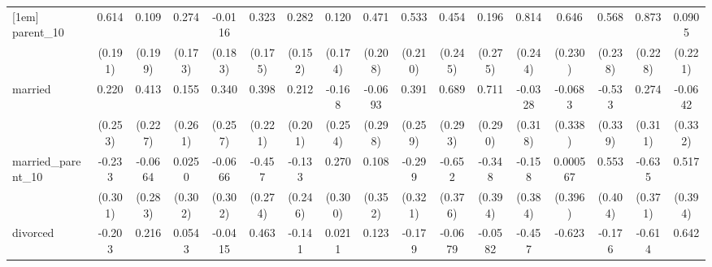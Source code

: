 {\begin{tabular}{l*{16}{c}}
[1em]
parent\_10           &       0.614\sym{**} &       0.109         &       0.274         &     -0.0116         &       0.323         &       0.282         &       0.120         &       0.471\sym{*}  &       0.533\sym{*}  &       0.454         &       0.196         &       0.814\sym{***}&       0.646\sym{**} &       0.568\sym{*}  &       0.873\sym{***}&      0.0905         \\
                    &     (0.191)         &     (0.199)         &     (0.173)         &     (0.183)         &     (0.175)         &     (0.152)         &     (0.174)         &     (0.208)         &     (0.210)         &     (0.245)         &     (0.275)         &     (0.244)         &     (0.230)         &     (0.238)         &     (0.228)         &     (0.221)         \\
[1em]
married             &       0.220         &       0.413         &       0.155         &       0.340         &       0.398         &       0.212         &      -0.168         &     -0.0693         &       0.391         &       0.689\sym{*}  &       0.711\sym{*}  &     -0.0328         &     -0.0683         &      -0.533         &       0.274         &     -0.0642         \\
                    &     (0.253)         &     (0.227)         &     (0.261)         &     (0.257)         &     (0.221)         &     (0.201)         &     (0.254)         &     (0.298)         &     (0.259)         &     (0.293)         &     (0.290)         &     (0.318)         &     (0.338)         &     (0.339)         &     (0.311)         &     (0.332)         \\
[1em]
married\_parent\_10   &      -0.233         &     -0.0664         &      0.0250         &     -0.0666         &      -0.457         &      -0.133         &       0.270         &       0.108         &      -0.299         &      -0.652         &      -0.348         &      -0.158         &    0.000567         &       0.553         &      -0.635         &       0.517         \\
                    &     (0.301)         &     (0.283)         &     (0.302)         &     (0.302)         &     (0.274)         &     (0.246)         &     (0.300)         &     (0.352)         &     (0.321)         &     (0.376)         &     (0.394)         &     (0.384)         &     (0.396)         &     (0.404)         &     (0.371)         &     (0.394)         \\
[1em]
divorced            &      -0.203         &       0.216         &      0.0543         &     -0.0415         &       0.463         &      -0.141         &      0.0211         &       0.123         &      -0.179         &     -0.0679         &     -0.0582         &      -0.457         &      -0.623         &      -0.176         &      -0.614         &       0.642         \\

\end{tabular}}
